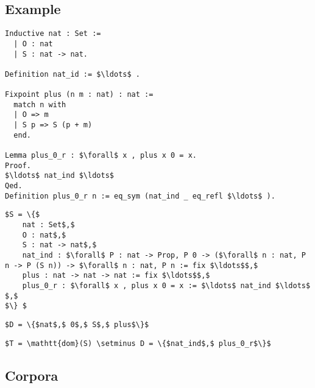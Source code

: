 \subsection{Example}
\begin{lstlisting}[language=Coq, mathescape]
Inductive nat : Set :=
  | O : nat
  | S : nat -> nat.

Definition nat_id := $\ldots$ .

Fixpoint plus (n m : nat) : nat :=
  match n with
  | O => m
  | S p => S (p + m)
  end.

Lemma plus_0_r : $\forall$ x , plus x 0 = x.
Proof.
$\ldots$ nat_ind $\ldots$
Qed.
Definition plus_0_r n := eq_sym (nat_ind _ eq_refl $\ldots$ ).
\end{lstlisting}

\begin{lstlisting}[language=Coq, mathescape, frame=none]
$S = \{$
	nat : Set$,$
	O : nat$,$
	S : nat -> nat$,$
	nat_ind : $\forall$ P : nat -> Prop, P 0 -> ($\forall$ n : nat, P n -> P (S n)) -> $\forall$ n : nat, P n := fix $\ldots$$,$
	plus : nat -> nat -> nat := fix $\ldots$$,$
	plus_0_r : $\forall$ x , plus x 0 = x := $\ldots$ nat_ind $\ldots$ $,$
$\} $
\end{lstlisting}

\begin{lstlisting}[language=Coq, mathescape, frame=none]
$D = \{$nat$,$ 0$,$ S$,$ plus$\}$
\end{lstlisting}

\begin{lstlisting}[language=Coq, mathescape, frame=none]
$T = \mathtt{dom}(S) \setminus D = \{$nat_ind$,$ plus_0_r$\}$
\end{lstlisting}

\subsection{Corpora}
\begin{description}
    \item[\compcert]
    \item[\formalin]
    \item[\corn]
    \item[\mathcomp]
\end{description}



